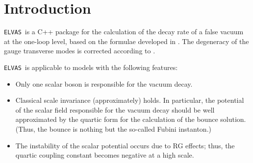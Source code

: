 \documentclass[12pt]{article}
\begin{document}
\newcommand{\lsim}{\stackrel{<}{_\sim}}
\newcommand{\gsim}{\stackrel{>}{_\sim}}

\newcommand{\codename}{{\tt ELVAS}\, }

\newcommand{\rem}[1]{{$\spadesuit$\bf #1$\spadesuit$}}


\renewcommand{\thefootnote}{\fnsymbol{footnote}}
\setcounter{footnote}{0}


\setcounter{page}{1}
\renewcommand{\thefootnote}{\#\arabic{footnote}}
\setcounter{footnote}{0}

\section{Introduction}

\codename is a C++ package for the calculation of the decay rate of a
false vacuum at the one-loop level, based on the formulae developed in
\cite{Chigusa:2017dux, Chigusa:2018uuj}. The degeneracy of the gauge transverse modes is corrected according to \cite{Baratella:2024hju}.

\codename is applicable to models with
the following features:
\begin{itemize}
\item Only one scalar boson is responsible for the vacuum decay.
\item Classical scale invariance (approximately) holds.  In
  particular, the potential of the scalar field responsible for the
  vacuum decay should be well approximated by the quartic form for
  the calculation of the bounce solution.  (Thus, the bounce is
  nothing but the so-called Fubini instanton.)
\item The instability of the scalar potential occurs due to RG
  effects; thus, the quartic coupling constant becomes negative at a
  high scale.
\end{itemize}
\end{document}
